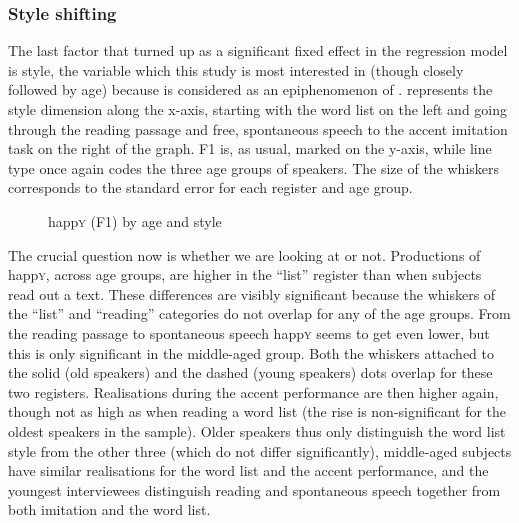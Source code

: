 \subsubsection{Style shifting}
\label{sec.prod.res.vow.happy.f1.shifting}

The last factor that turned up as a significant fixed effect in the regression model is style, the variable which this study is most interested in (though closely followed by age) because  is considered as an epiphenomenon of .
 represents the style dimension along the x-axis, starting with the word list on the left and going through the reading passage and free, spontaneous speech to the accent imitation task on the right of the graph.
F1 is, as usual, marked on the y-axis, while line type once again codes the three age groups of speakers.
The size of the whiskers corresponds to the standard error for each register and age group.

\begin{figure}
	
		\resizebox{0.5\linewidth}{!}{} 
	\caption{happ\textsc{y} (F1) by age and style}
	\label{fig.line.f1w.happy.tot}
\end{figure}

The crucial question now is whether we are looking at  or not.
Productions of happ\textsc{y}, across age groups, are higher in the ``list'' register than when subjects read out a text.
These differences are visibly significant because the whiskers of the ``list'' and ``reading'' categories do not overlap for any of the age groups.
From the reading passage to spontaneous speech happ\textsc{y} seems to get even lower, but this is only significant in the middle-aged group.
Both the whiskers attached to the solid (old speakers) and the dashed (young speakers) dots overlap for these two registers.
Realisations during the accent performance are then higher again, though not as high as when reading a word list (the rise is non-significant for the oldest speakers in the sample).
Older speakers thus only distinguish the word list style from the other three (which do not differ significantly), middle-aged subjects have similar realisations for the word list and the accent performance, and the youngest interviewees distinguish reading and spontaneous speech together from both imitation and the word list.

